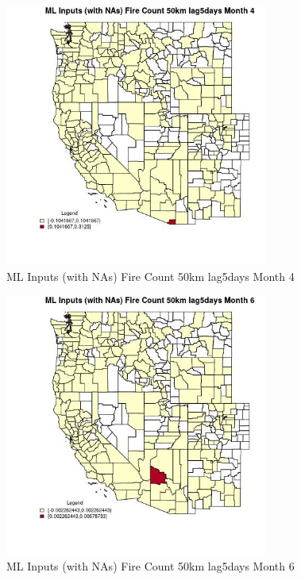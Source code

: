 \begin{figure} 
\centering  
\includegraphics[width=0.77\textwidth]{Code_Outputs/Report_ML_input_PM25_Step4_part_e_de_duplicated_aves_compiled_2019-05-21wNAs_CountyFire_Count_50km_lag5daysmedianMonth4.jpg} 
\caption{\label{fig:Report_ML_input_PM25_Step4_part_e_de_duplicated_aves_compiled_2019-05-21wNAsCountyFire_Count_50km_lag5daysmedianMonth4}ML Inputs (with NAs) Fire Count 50km lag5days Month 4} 
\end{figure} 
 

\begin{figure} 
\centering  
\includegraphics[width=0.77\textwidth]{Code_Outputs/Report_ML_input_PM25_Step4_part_e_de_duplicated_aves_compiled_2019-05-21wNAs_CountyFire_Count_50km_lag5daysmedianMonth6.jpg} 
\caption{\label{fig:Report_ML_input_PM25_Step4_part_e_de_duplicated_aves_compiled_2019-05-21wNAsCountyFire_Count_50km_lag5daysmedianMonth6}ML Inputs (with NAs) Fire Count 50km lag5days Month 6} 
\end{figure} 
 

